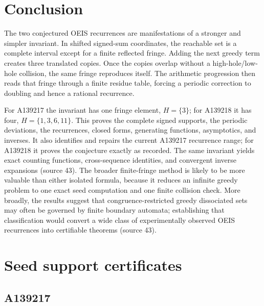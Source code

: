 \documentclass[11pt,a4paper]{article}
\numberwithin{equation}{section}
\theoremstyle{definition}
\theoremstyle{remark}
\theoremstyle{plain}
\newcommand{\src}[1]{\textup{(source #1)}}
\begin{document}
\section{Conclusion}\label{gdf:sec:conclusion}

The two conjectured OEIS recurrences are manifestations of a stronger and
simpler invariant.  In shifted signed-sum coordinates, the reachable set is a
complete interval except for a finite reflected fringe.  Adding the next
greedy term creates three translated copies.  Once the copies overlap without
a high-hole/low-hole collision, the same fringe reproduces itself.  The
arithmetic progression then reads that fringe through a finite residue table,
forcing a periodic correction to doubling and hence a rational recurrence.

For A139217 the invariant has one fringe element, $H=\{3\}$; for A139218 it
has four, $H=\{1,3,6,11\}$.  This proves the complete signed supports, the
periodic deviations, the recurrences, closed forms, generating functions,
asymptotics, and inverses.  It also identifies and repairs the current
A139217 recurrence range; for A139218 it proves the conjecture exactly as
recorded.  The same invariant yields exact counting functions,
cross-sequence identities, and convergent inverse expansions \src{43}.  The
broader finite-fringe method is likely to be more valuable than either
isolated formula, because it reduces an infinite greedy problem to one exact
seed computation and one finite collision check.  More broadly, the results
suggest that congruence-restricted greedy dissociated sets may often be
governed by finite boundary automata; establishing that classification would
convert a wide class of experimentally observed OEIS recurrences into
certifiable theorems \src{43}.

\appendix

\section{Seed support certificates}\label{gdf:app:seeds}

\subsection{A139217}
\end{document}
